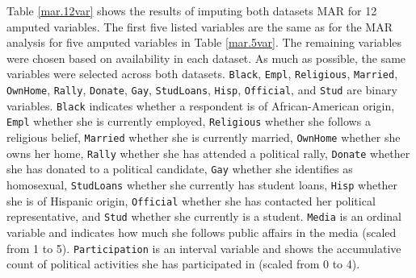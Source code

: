 \documentclass[12pt,econ]{sources/authesis}
\begin{document}
Table \ref{mar.12var} shows the results of imputing both datasets MAR for 12 amputed variables. The first five listed variables are the same as for the MAR analysis for five amputed variables in Table \ref{mar.5var}. The remaining variables were chosen based on availability in each dataset. As much as possible, the same variables were selected across both datasets. \texttt{Black}, \texttt{Empl}, \texttt{Religious}, \texttt{Married}, \texttt{OwnHome}, \texttt{Rally}, \texttt{Donate}, \texttt{Gay}, \texttt{StudLoans}, \texttt{Hisp}, \texttt{Official}, and \texttt{Stud} are binary variables. \texttt{Black} indicates whether a respondent is of African-American origin, \texttt{Empl} whether she is currently employed, \texttt{Religious} whether she follows a religious belief, \texttt{Married} whether she is currently married, \texttt{OwnHome} whether she owns her home, \texttt{Rally} whether she has attended a political rally, \texttt{Donate} whether she has donated to a political candidate, \texttt{Gay} whether she identifies as homosexual, \texttt{StudLoans} whether she currently has student loans, \texttt{Hisp} whether she is of Hispanic origin, \texttt{Official} whether she has contacted her political representative, and \texttt{Stud} whether she currently is a student. \texttt{Media} is an ordinal variable and indicates how much she follows public affairs in the media (scaled from 1 to 5). \texttt{Participation} is an interval variable and shows the accumulative count of political activities she has participated in (scaled from 0 to 4).

\ssp
\end{document}
